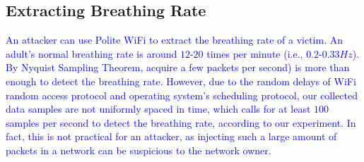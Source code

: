 


\subsection{Extracting Breathing Rate}
\label{sec:algo}
\textcolor{blue}{An attacker can use Polite WiFi to extract the breathing rate of a victim. An adult's normal breathing rate is around $12$-$20$ times per minute (i.e., $0.2$-$0.33 Hz$). By Nyquist Sampling Theorem, acquire a few packets per second) is more than enough to detect the breathing rate. However, due to the random delays of WiFi random access protocol and operating system's scheduling protocol, our collected data samples are not uniformly spaced in time, which calls for at least $100$ samples per second to detect the breathing rate, according to our experiment. In fact, this is not practical for an attacker, as injecting such a large amount of packets in a network can be suspicious to the network owner.}

